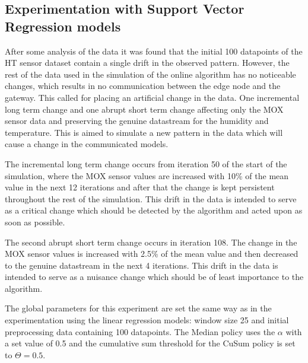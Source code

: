 \documentclass{mpaper}
\begin{document}
\subsection{Experimentation with Support Vector Regression models}

After some analysis of the data it was found that the initial 100 datapoints of the HT sensor dataset contain a single drift in the observed pattern. However, the rest of the data used in the simulation of the online algorithm has no noticeable changes, which results in no communication between the edge node and the gateway. This called for placing an artificial change in the data. One incremental long term change and one abrupt short term change affecting only the MOX sensor data and preserving the genuine datastream for the humidity and temperature. This is aimed to simulate a new pattern in the data which will cause a change in the communicated models.

The incremental long term change occurs from iteration 50 of the start of the simulation, where the MOX sensor values are increased with 10\% of the mean value in the next 12 iterations and after that the change is kept persistent throughout the rest of the simulation. This drift in the data is intended to serve as a critical change \cite{lautay2018} which should be detected by the algorithm and acted upon as soon as possible.

The second abrupt short term change occurs in iteration 108. The change in the MOX sensor values is increased with 2.5\% of the mean value and then decreased to the genuine datastream in the next 4 iterations. This drift in the data is intended to serve as a nuisance change \cite{lautay2018} which should be of least importance to the algorithm.

The global parameters for this experiment are set the same way as in the experimentation using the linear regression models: window size 25 and initial preprocessing data containing 100 datapoints. 
The Median policy uses the $\alpha$ with a set value of 0.5 and the cumulative sum threshold for the CuSum policy is set to $\Theta=0.5$.
\end{document}
